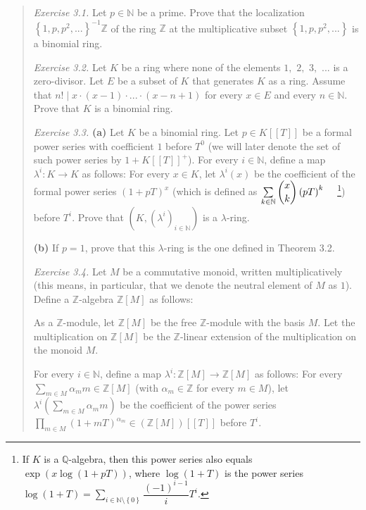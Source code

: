 \documentclass[numbers=enddot,12pt,final,onecolumn,notitlepage]{scrartcl}%
\begin{document}
\begin{quotation}
\textit{Exercise 3.1.} Let $p\in\mathbb{N}$ be a prime. Prove that the
localization $\left\{  1,p,p^{2},...\right\}  ^{-1}\mathbb{Z}$ of the ring
$\mathbb{Z}$ at the multiplicative subset $\left\{  1,p,p^{2},...\right\}  $
is a binomial ring.

\textit{Exercise 3.2.} Let $K$ be a ring where none of the elements $1,$ $2,$
$3,$ $...$ is a zero-divisor. Let $E$ be a subset of $K$ that generates $K$ as
a ring. Assume that $n!\mid x\cdot\left(  x-1\right)  \cdot...\cdot\left(
x-n+1\right)  $ for every $x\in E$ and every $n\in\mathbb{N}$. Prove that $K$
is a binomial ring.

\textit{Exercise 3.3.} \textbf{(a)} Let $K$ be a binomial ring. Let $p\in
K\left[  \left[  T\right]  \right]  $ be a formal power series with
coefficient $1$ before $T^{0}$ (we will later denote the set of such power
series by $1+K\left[  \left[  T\right]  \right]  ^{+}$). For every
$i\in\mathbb{N}$, define a map $\lambda^{i}:K\rightarrow K$ as follows: For
every $x\in K$, let $\lambda^{i}\left(  x\right)  $ be the coefficient of the
formal power series $\left(  1+pT\right)  ^{x}$ (which is defined as
$\sum\limits_{k\in\mathbb{N}}\dbinom{x}{k}\left(  pT\right)  ^{k}%
\ \ \ \ $\footnote{If $K$ is a $\mathbb{Q}$-algebra, then this power series
also equals $\exp\left(  x\log\left(  1+pT\right)  \right)  $, where
$\log\left(  1+T\right)  $ is the power series $\log\left(  1+T\right)
=\sum\limits_{i\in\mathbb{N}\setminus\left\{  0\right\}  }\dfrac{\left(
-1\right)  ^{i-1}}{i}T^{i}$.}) before $T^{i}$. Prove that $\left(  K,\left(
\lambda^{i}\right)  _{i\in\mathbb{N}}\right)  $ is a $\lambda$-ring.

\textbf{(b)} If $p=1$, prove that this $\lambda$-ring is the one defined in
Theorem 3.2.

\textit{Exercise 3.4.} Let $M$ be a commutative monoid, written
multiplicatively (this means, in particular, that we denote the neutral
element of $M$ as $1$). Define a $\mathbb{Z}$-algebra $\mathbb{Z}\left[
M\right]  $ as follows:

As a $\mathbb{Z}$-module, let $\mathbb{Z}\left[  M\right]  $ be the free
$\mathbb{Z}$-module with the basis $M$. Let the multiplication on
$\mathbb{Z}\left[  M\right]  $ be the $\mathbb{Z}$-linear extension of the
multiplication on the monoid $M$.

For every $i\in\mathbb{N}$, define a map $\lambda^{i}:\mathbb{Z}\left[
M\right]  \rightarrow\mathbb{Z}\left[  M\right]  $ as follows: For every
$\sum\limits_{m\in M}\alpha_{m}m\in\mathbb{Z}\left[  M\right]  $ (with
$\alpha_{m}\in\mathbb{Z}$ for every $m\in M$), let $\lambda^{i}\left(
\sum\limits_{m\in M}\alpha_{m}m\right)  $ be the coefficient of the power
series $\prod\limits_{m\in M}\left(  1+mT\right)  ^{\alpha_{m}}\in\left(
\mathbb{Z}\left[  M\right]  \right)  \left[  \left[  T\right]  \right]  $
before $T^{i}$.


\end{quotation}
\end{document}
